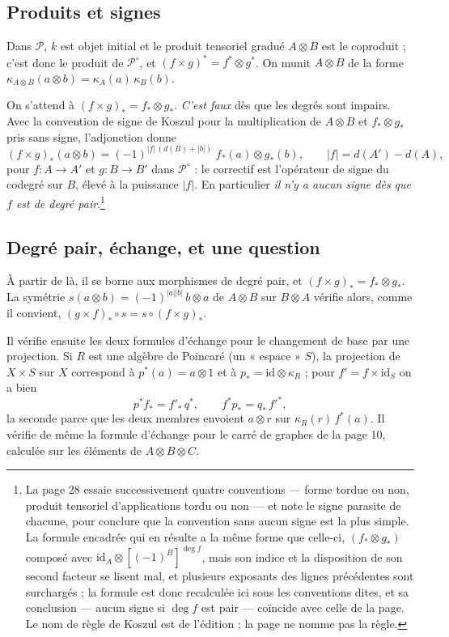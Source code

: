 \documentclass[11pt,a4paper]{article}
\begin{document}
\subsection*{Produits et signes}

Dans $\mathcal{P}$, $k$ est objet initial et le produit tensoriel gradué
$A \otimes B$ est le coproduit ; c'est donc le produit de
$\mathcal{P}^{\circ}$, et $(f \times g)^{*} = f^{*} \otimes g^{*}$. On munit
$A \otimes B$ de la forme $\kappa_{A \otimes B}(a \otimes b) = \kappa_{A}(a)\,\kappa_{B}(b)$.

On s'attend à $(f \times g)_{*} = f_{*} \otimes g_{*}$. \emph{C'est faux} dès
que les degrés sont impairs. Avec la convention de signe de Koszul pour la
multiplication de $A \otimes B$ et $f_{*} \otimes g_{*}$ pris sans signe,
l'adjonction donne
\[ (f \times g)_{*}(a \otimes b) = (-1)^{|f|\,(d(B) + |b|)}\; f_{*}(a) \otimes g_{*}(b) , \qquad |f| = d(A') - d(A) , \]
pour $f \colon A \to A'$ et $g \colon B \to B'$ dans $\mathcal{P}^{\circ}$ : le
correctif est l'opérateur de signe du codegré sur $B$, élevé à la puissance
$|f|$. En particulier \emph{il n'y a aucun signe dès que $f$ est de degré
pair}.\footnote{La page 28 essaie successivement quatre conventions ---
forme tordue ou non, produit tensoriel d'applications tordu ou non --- et note
le signe parasite de chacune, pour conclure que la convention sans aucun signe
est la plus simple. La formule encadrée qui en résulte a la même forme que
celle-ci, $(f_{*} \otimes g_{*})$ composé avec
$\mathrm{id}_{A} \otimes [(-1)^{B}]^{\deg f}$, mais son indice et la
disposition de son second facteur se lisent mal, et plusieurs exposants des
lignes précédentes sont surchargés ; la formule est donc recalculée ici sous
les conventions dites, et sa conclusion --- aucun signe si $\deg f$ est pair
--- coïncide avec celle de la page. Le nom de règle de Koszul est de
l'édition ; la page ne nomme pas la règle.}

\subsection*{Degré pair, échange, et une question}

À partir de là, il se borne aux morphismes de degré pair, et
$(f \times g)_{*} = f_{*} \otimes g_{*}$. La symétrie
$s(a \otimes b) = (-1)^{|a||b|}\, b \otimes a$ de $A \otimes B$ sur
$B \otimes A$ vérifie alors, comme il convient,
$(g \times f)_{*} \circ s = s \circ (f \times g)_{*}$.

Il vérifie ensuite les deux formules d'échange pour le changement de base par
une projection. Si $R$ est une algèbre de Poincaré (un « espace » $S$), la
projection de $X \times S$ sur $X$ correspond à $p^{*}(a) = a \otimes 1$ et à
$p_{*} = \mathrm{id} \otimes \kappa_{R}$ ; pour $f' = f \times \mathrm{id}_{S}$
on a bien
\[ p^{*} f_{*} = f'_{*}\, q^{*} , \qquad f^{*} p_{*} = q_{*}\, f'^{*} , \]
la seconde parce que les deux membres envoient $a \otimes r$ sur
$\kappa_{R}(r)\, f^{*}(a)$. Il vérifie de même la formule d'échange pour le
carré de graphes de la page 10, calculée sur les éléments de
$A \otimes B \otimes C$.
\end{document}
